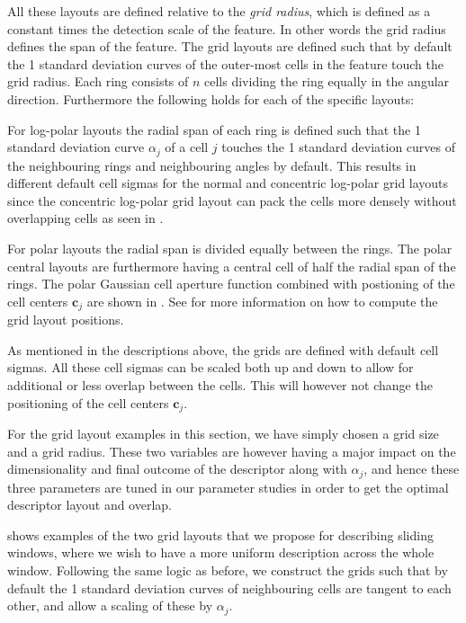 \documentclass[thesis.tex]{subfiles}
\def\c{\mathbf{c}}
\begin{document}
All these layouts are defined relative to the \emph{grid radius}, which is defined as a constant times the detection scale of the feature. In other words the grid radius defines the span of the feature. The grid layouts are defined such that by default the 1 standard deviation curves of the outer-most cells in the feature touch the grid radius. Each ring consists of $n$ cells dividing the ring equally in the angular direction. Furthermore the following holds for each of the specific layouts:

For log-polar layouts the radial span of each ring is defined such that the 1 standard deviation curve $\alpha_j$ of a cell $j$ touches the 1 standard deviation curves of the neighbouring rings and neighbouring angles by default. This results in different default cell sigmas for the normal and concentric log-polar grid layouts since the concentric log-polar grid layout can pack the cells more densely without overlapping cells as seen in .

For polar layouts the radial span is divided equally between the rings. The polar central layouts are furthermore having a central cell of half the radial span of the rings. The polar Gaussian cell aperture function combined with postioning of the cell centers $\c_j$ are shown in .
See  for more information on how to compute the grid layout positions.

As mentioned in the descriptions above, the grids are defined with default cell sigmas. All these cell sigmas can be scaled both up and down to allow for additional or less overlap between the cells. This will however not change the positioning of the cell centers $\c_j$.

For the grid layout examples in this section, we have simply chosen a grid size and a grid radius. These two variables are however having a major impact on the dimensionality and final outcome of the descriptor along with $\alpha_j$, and hence these three parameters are tuned in our parameter studies in order to get the optimal descriptor layout and overlap.

 shows examples of the two grid layouts that we propose for describing sliding windows, where we wish to have a more uniform description across the whole window. Following the same logic as before, we construct the grids such that by default the 1 standard deviation curves of neighbouring cells are tangent to each other, and allow a scaling of these by $\alpha_j$.
\end{document}
